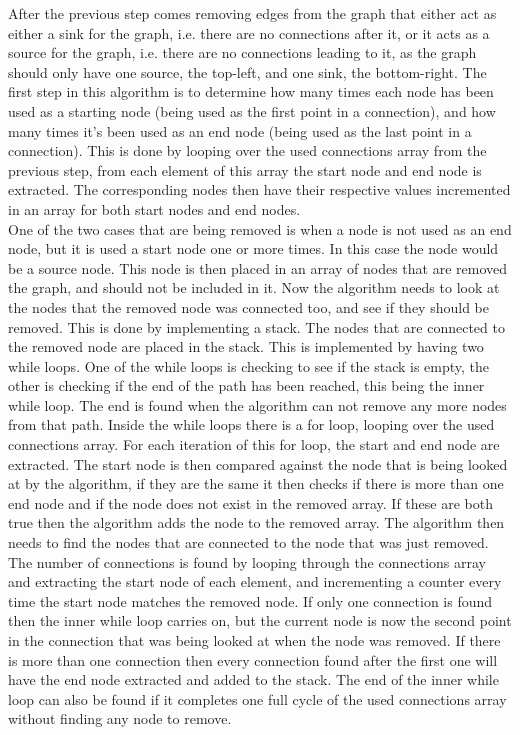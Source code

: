 	After the previous step comes removing edges from the graph that either act as either a sink for the graph, i.e. there are no connections after it, or it acts as a source for the graph, i.e. there are no connections leading to it, as the graph should only have one source, the top-left, and one sink, the bottom-right. The first step in this algorithm is to determine how many times each node has been used as a starting node (being used as the first point in a connection), and how many times it's been used as an end node (being used as the last point in a connection). This is done by looping over the used connections array from the previous step, from each element of this array the start node and end node is extracted. The corresponding nodes then have their respective values incremented in an array for both start nodes and end nodes.\\
	One of the two cases that are being removed is when a node is not used as an end node, but it is used a start node one or more times. In this case the node would be a source node. This node is then placed in an array of nodes that are removed the graph, and should not be included in it. Now the algorithm needs to look at the nodes that the removed node was connected too, and see if they should be removed. This is done by implementing a stack. The nodes that are connected to the removed node are placed in the stack. This is implemented by having two while loops. One of the while loops is checking to see if the stack is empty, the other is checking if the end of the path has been reached, this being the inner while loop. The end is found when the algorithm can not remove any more nodes from that path. Inside the while loops there is a for loop, looping over the used connections array. For each iteration of this for loop, the start and end node are extracted. The start node is then compared against the node that is being looked at by the algorithm, if they are the same it then checks if there is more than one end node and if the node does not exist in the removed array. If these are both true then the algorithm adds the node to the removed array. The algorithm then needs to find the nodes that are connected to the node that was just removed. The number of connections is found by looping through the connections array and extracting the start node of each element, and incrementing a counter every time the start node matches the removed node. If only one connection is found then the inner while loop carries on, but the current node is now the second point in the connection that was being looked at when the node was removed. If there is more than one connection then every connection found after the first one will have the end node extracted and added to the stack. The end of the inner while loop can also be found if it completes one full cycle of the used connections array without finding any node to remove.\\
